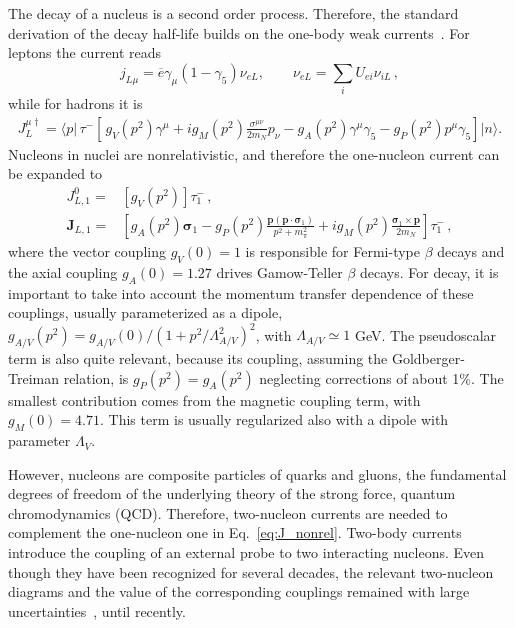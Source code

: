 The \bbonu decay of a nucleus is a second order process. Therefore, the standard derivation of the \bbonu decay half-life builds on the one-body weak currents~\cite{Doi:1985dx,Tomoda:1990rs,Engel:2016xgb}. For leptons the current reads
\begin{equation}
j_{L\mu}=\overline{e}\gamma_{\mu}\left(1-\gamma_{5}\right)\nu_{eL}, \qquad \nu_{eL}=\sum_{i}U_{ei}\nu_{iL}\,,
\label{eq:j_mu}
\end{equation}
while for hadrons it is
\begin{align}
J_{L}^{\mu\dagger} = \langle  p \rvert\, \tau^{-}
\left[\frac{}{}g_{V}(p^{2})\gamma^{\mu}
+ig_{M}(p^{2})\frac{\sigma^{\mu\nu}}{2m_{N}}p_{\nu}
-g_{A}(p^{2})\gamma^{\mu}\gamma_{5}
-g_{P}(p^{2})p^{\mu}\gamma_{5}
\right] \lvert n \rangle.
\label{eq:J_mu}
\end{align}
Nucleons in nuclei are nonrelativistic, and therefore the one-nucleon current can be expanded to
\begin{align}
J^0_{L,1}=&\left[g_V(p^2)\right]\tau^-_1\,, \nonumber \\
\bm{J}_{L,1}=&\left[
g_A(p^2) {\bm \sigma}_1
-g_P(p^2)\frac{{\bm p}\left({\bm p}\cdot{\bm \sigma}_1\right)}{p^2+m_{\pi}^2}
+ig_M (p^2)\frac{{\bm \sigma}_1\times{\bm p}}{2m_N}
\right]\tau^-_1\,,
\label{eq:J_nonrel}
\end{align}
where the vector coupling $g_V(0)=1$ is responsible for Fermi-type $\beta$ decays and the axial coupling $g_A(0)=1.27$ drives Gamow-Teller $\beta$ decays. For \bbonu decay, it is important to take into account the momentum transfer dependence of these couplings, usually parameterized as a dipole, $g_{A/V}(p^2)=g_{A/V}(0)/(1+p^2/\Lambda_{A/V}^2)^2$, with $\Lambda_{A/V}\simeq 1$ GeV. The pseudoscalar term is also quite relevant, because its coupling, assuming the Goldberger-Treiman relation, is $g_P(p^2)=g_A(p^2)$ neglecting corrections of about 1\%. The smallest contribution comes from the magnetic coupling term, with $g_M(0)=4.71$. This term is usually regularized also with a dipole with parameter $\Lambda_V$.

However, nucleons are composite particles of quarks and gluons, the fundamental degrees of freedom of the underlying theory of the strong force, quantum chromodynamics (QCD). Therefore, two-nucleon currents are needed to complement the one-nucleon one in Eq.~\eqref{eq:J_nonrel}. Two-body currents introduce the coupling of an external probe to two interacting nucleons. Even though they have been recognized for several decades, the relevant two-nucleon diagrams and the value of the corresponding couplings remained with large uncertainties~\cite{Brown:1987obh,Towner:1987zz}, until recently.

